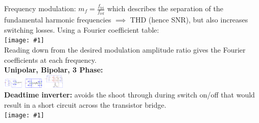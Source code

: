 \documentclass[10pt,landscape,a4paper]{article}
\newcommand{\subs}[1]{\ensuremath{_{\text{#1}}}}
\newcommand{\inlineimage}[1]{\texttt{[image: \#1]}\\}
\begin{document}
\begin{multicols*}{4}
		Frequency modulation: $ m_f = \frac{f\subs{tri}}{f\subs{ref}} $ which describes the separation of the fundamental harmonic frequencies $ \implies $ THD (hence SNR), but also increases switching losses.
		Using a Fourier coefficient table:\\
		\inlineimage{PWMfouriercoeff.png}
		Reading down from the desired modulation amplitude ratio gives the Fourier coefficients at each frequency.\\
		\textbf{Unipolar, Bipolar, 3 Phase:}\\
		\includegraphics[width=0.07\textwidth]{PWMunipolar.png}
		\includegraphics[width=0.07\textwidth]{PWMbipolar.png}
		\includegraphics[width=0.07\textwidth]{PWM3phase.png}\\
		\textbf{Deadtime inverter:} avoids the shoot through during switch on/off that would result in a short circuit across the transistor bridge.\\
		\inlineimage{deadtime.png}
		
		
	\end{multicols*}
\end{document}
